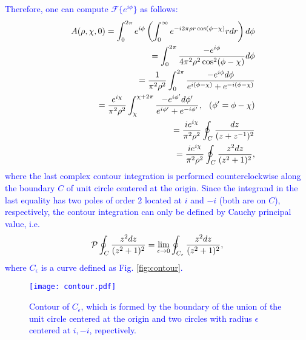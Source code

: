 \textcolor{blue}{
Therefore, one can compute $\mathcal{F}\{e^{i\phi}\}$ as follows:
\begin{eqnarray}
	&&A(\rho, \chi, 0) = \int_{0}^{2\pi} e^{i\phi} 
		\left(\int_{0}^{\infty} e^{-i2\pi \rho r \cos(\phi - \chi)} r dr\right) d\phi
	\nonumber\\
	&&\hspace{0.5in}= \int_{0}^{2\pi} \frac{-e^{i\phi}}{4 \pi^2 \rho^2 \cos^2(\phi - \chi)} d\phi
	\nonumber\\
	&&\hspace{0.5in}= \frac{1}{\pi^2 \rho^2} \int_{0}^{2\pi} \frac{-e^{i\phi} d\phi}{e^{i(\phi - \chi)} + e^{-i(\phi - \chi)}}
	\nonumber\\
	&&\hspace{0.5in}= \frac{ e^{i\chi} }{\pi^2 \rho^2} \int_{\chi}^{\chi + 2\pi}
		\frac{-e^{i\phi'} d\phi'}{e^{i\phi'} + e^{-i\phi'}},
	\hspace{0.1in} (\phi' = \phi - \chi)
	\nonumber\\
	&&\hspace{0.5in}= \frac{i e^{i \chi}}{\pi^2 \rho^2} \oint_C \frac{dz}{(z + z^{-1})^2}
	\nonumber\\
	&&\hspace{0.5in}= \frac{i e^{i \chi}}{\pi^2 \rho^2} \oint_C \frac{z^2 dz}{(z^2 + 1)^2},
\end{eqnarray}
where the last complex contour integration is performed counterclockwise along the boundary $C$ of unit circle centered at the origin. Since the integrand in the last equality has two poles of order $2$ located at $i$ and $-i$ (both are on $C$), respectively, the contour integration can only be defined by Cauchy principal value, i.e.
\begin{eqnarray}
	{\cal P} \oint_C \frac{z^2 dz}{(z^2 + 1)^2} = \lim_{\epsilon \rightarrow 0} \oint_{C_{\epsilon}} \frac{z^2 dz}{(z^2 + 1)^2},
	\label{eq:CPV}
\end{eqnarray}
where $C_{\epsilon}$ is a curve defined as Fig. \ref{fig:contour}.
\begin{figure}
	\centering
	\texttt{[image: contour.pdf]}
	\caption{Contour of $C_{\epsilon}$, which is formed by the boundary of the union of the unit circle centered at the origin and two circles with radius $\epsilon$ centered at $i, -i$, repectively.}

\end{figure}}
